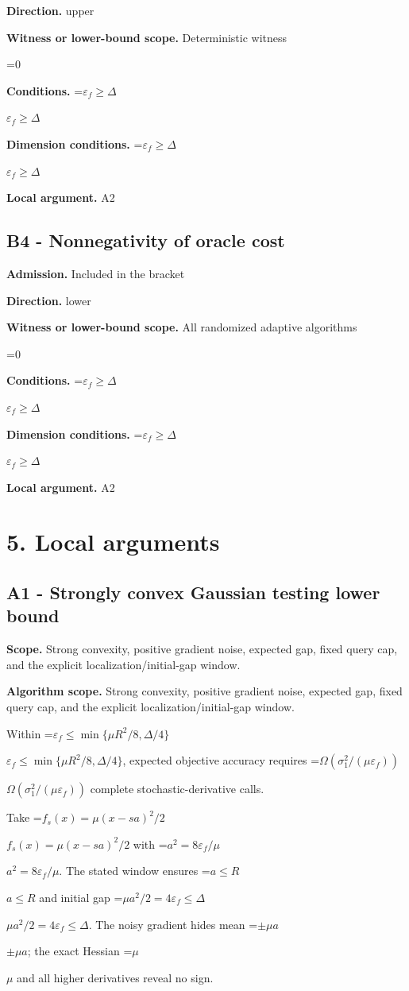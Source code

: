 \documentclass[10pt,a4paper]{article}
\newcommand{\AtlasMath}[1]{\par\begingroup\centering\setbox0=\hbox{$\displaystyle #1$}\ifdim\wd0>1.4\linewidth\typeout{ATLAS WIDE FORMULA: \the\wd0}\fi\ifdim\wd0>\linewidth\resizebox{\linewidth}{!}{\box0}\else\box0\fi\par\endgroup}
\newcommand{\AtlasInlineMath}[1]{\begingroup\setbox0=\hbox{$#1$}\ifdim\wd0>.4\linewidth\endgroup\AtlasMath{#1}\else\endgroup$#1$\fi}
\begin{document}
\textbf{Direction.} upper

\textbf{Witness or lower-bound scope.} Deterministic witness

\AtlasMath{0}
\textbf{Conditions.} \AtlasInlineMath{\varepsilon_f\ge\Delta}

\textbf{Dimension conditions.} \AtlasInlineMath{\varepsilon_f\ge\Delta}

\textbf{Local argument.} A2

\subsection{B4 - Nonnegativity of oracle cost}
\textbf{Admission.} Included in the bracket

\textbf{Direction.} lower

\textbf{Witness or lower-bound scope.} All randomized adaptive algorithms

\AtlasMath{0}
\textbf{Conditions.} \AtlasInlineMath{\varepsilon_f\ge\Delta}

\textbf{Dimension conditions.} \AtlasInlineMath{\varepsilon_f\ge\Delta}

\textbf{Local argument.} A2

\section{5. Local arguments}
\subsection{A1 - Strongly convex Gaussian testing lower bound}
\textbf{Scope.} Strong convexity, positive gradient noise, expected gap, fixed query cap, and the explicit localization/initial-gap window.

\textbf{Algorithm scope.} Strong convexity, positive gradient noise, expected gap, fixed query cap, and the explicit localization/initial-gap window.

Within \AtlasInlineMath{\varepsilon_f\le\min\{\mu R^2/8,\Delta/4\}}, expected objective accuracy requires \AtlasInlineMath{\Omega(\sigma_1^2/(\mu\varepsilon_f))} complete stochastic-derivative calls.

Take \AtlasInlineMath{f_s(x)=\mu(x-sa)^2/2} with \AtlasInlineMath{a^2=8\varepsilon_f/\mu}. The stated window ensures \AtlasInlineMath{a\le R} and initial gap \AtlasInlineMath{\mu a^2/2=4\varepsilon_f\le\Delta}. The noisy gradient hides mean \AtlasInlineMath{\pm\mu a}; the exact Hessian \AtlasInlineMath{\mu} and all higher derivatives reveal no sign.
\end{document}
